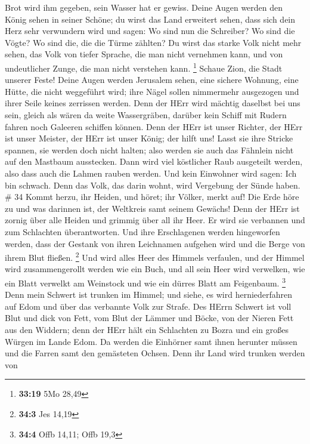 Brot wird ihm gegeben, sein Wasser hat er gewiss.  Deine
Augen werden den König sehen in seiner Schöne; du wirst das Land
erweitert sehen,  dass sich dein Herz sehr verwundern wird
und sagen: Wo sind nun die Schreiber? Wo sind die Vögte? Wo sind die,
die die Türme zählten?  Du wirst das starke Volk nicht mehr
sehen, das Volk von tiefer Sprache, die man nicht vernehmen kann, und
von undeutlicher Zunge, die man nicht verstehen kann. \footnote{\textbf{33:19}
  5Mo 28,49}  Schaue Zion, die Stadt unserer Feste! Deine
Augen werden Jerusalem sehen, eine sichere Wohnung, eine Hütte, die
nicht weggeführt wird; ihre Nägel sollen nimmermehr ausgezogen und ihrer
Seile keines zerrissen werden.  Denn der HErr wird mächtig
daselbst bei uns sein, gleich als wären da weite Wassergräben, darüber
kein Schiff mit Rudern fahren noch Galeeren schiffen können.
 Denn der HErr ist unser Richter, der HErr ist unser
Meister, der HErr ist unser König; der hilft uns!  Lasst
sie ihre Stricke spannen, sie werden doch nicht halten; also werden sie
auch das Fähnlein nicht auf den Mastbaum ausstecken. Dann wird viel
köstlicher Raub ausgeteilt werden, also dass auch die Lahmen rauben
werden.  Und kein Einwohner wird sagen: Ich bin schwach.
Denn das Volk, das darin wohnt, wird Vergebung der Sünde haben. \# 34
 Kommt herzu, ihr Heiden, und höret; ihr Völker, merkt auf!
Die Erde höre zu und was darinnen ist, der Weltkreis samt seinem
Gewächs!  Denn der HErr ist zornig über alle Heiden und
grimmig über all ihr Heer. Er wird sie verbannen und zum Schlachten
überantworten.  Und ihre Erschlagenen werden hingeworfen
werden, dass der Gestank von ihren Leichnamen aufgehen wird und die
Berge von ihrem Blut fließen. \footnote{\textbf{34:3} Jes 14,19}
 Und wird alles Heer des Himmels verfaulen, und der Himmel
wird zusammengerollt werden wie ein Buch, und all sein Heer wird
verwelken, wie ein Blatt verwelkt am Weinstock und wie ein dürres Blatt
am Feigenbaum. \footnote{\textbf{34:4} Offb 14,11; Offb 19,3}
 Denn mein Schwert ist trunken im Himmel; und siehe, es wird
herniederfahren auf Edom und über das verbannte Volk zur Strafe.
 Des HErrn Schwert ist voll Blut und dick von Fett, vom Blut
der Lämmer und Böcke, von der Nieren Fett aus den Widdern; denn der HErr
hält ein Schlachten zu Bozra und ein großes Würgen im Lande Edom.
 Da werden die Einhörner samt ihnen herunter müssen und die
Farren samt den gemästeten Ochsen. Denn ihr Land wird trunken werden von
